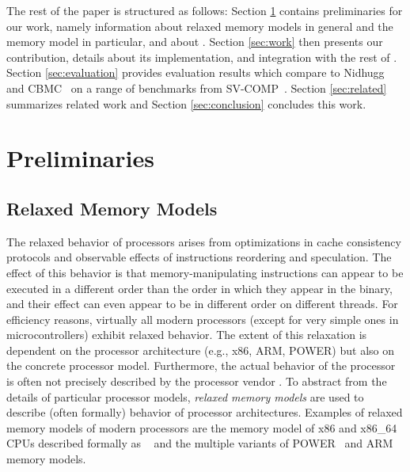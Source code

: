 The rest of the paper is structured as follows: Section \ref{sec:preliminaries} contains preliminaries for our work, namely information about relaxed memory models in general and the \xtso memory model in particular, and about \divine.
Section \ref{sec:work} then presents our contribution, details about its implementation, and integration with the rest of \divine.
Section \ref{sec:evaluation} provides evaluation results which compare \divine to Nidhugg~\cite{Abdulla2015} and CBMC~\cite{Clarke2004} on a range of benchmarks from \mbox{SV-COMP}~\cite{SV-COMP:2017}.
Section \ref{sec:related} summarizes related work and Section \ref{sec:conclusion} concludes this work.



\section{Preliminaries} \label{sec:preliminaries}

\subsection{Relaxed Memory Models} \label{sec:rmm}

The relaxed behavior of processors arises from optimizations in cache consistency protocols and observable effects of instructions reordering and speculation.
The effect of this behavior is that memory-manipulating instructions can appear to be executed in a different order than the order in which they appear in the binary, and their effect can even appear to be in different order on different threads.
For efficiency reasons, virtually all modern processors (except for very simple ones in microcontrollers) exhibit relaxed behavior.
The extent of this relaxation is dependent on the processor architecture (e.g., x86, ARM, POWER) but also on the concrete processor model.
Furthermore, the actual behavior of the processor is often not precisely described by the processor vendor \cite{x86tso}.
To abstract from the details of particular processor models, \emph{relaxed memory models} are used to describe (often formally) behavior of processor architectures.
Examples of relaxed memory models of modern processors are the memory model of x86 and x86\_64 CPUs described formally as \xtso~\cite{x86tso} and the multiple variants of POWER~\cite{Sarkar2011,Mador-Haim2012} and ARM~\cite{Flur2016,Alglave2014,Pulte2017} memory models.

